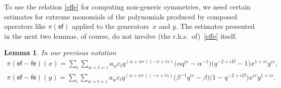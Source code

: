 \documentclass[pdftex]{sigma}
\numberwithin{equation}{section}
\newtheorem{Lemma}[Theorem]{Lemma}
\begin{document}
To use the relation \eqref{effe} for computing non-generic symmetries, we need certain estimates for extreme monomials of the polynomials produced by composed operators like $\pi(\mathsf{ef})$ applied to the generators~$x$ and $y$. The estimates presented in the next two lemmas, of course, do not involve (the r.h.s.\ of)~\eqref{effe} itself.

\begin{Lemma}\label{ef-fe}
In our previous notation
\begin{gather}
\pi(\mathsf{ef-fe})(x) =\sum_i\sum_{w+t=i}a_wc_tq^{(u+wr)(-v+ts)} \big(\alpha q^{is}-\alpha^{-1}\big)\big(q^{-2+iD}-1\big)x^{1+ir}y^{is}, \label{(ef-fe)x}\\
 \pi(\mathsf{ef-fe})(y) =\sum_i\sum_{w+t=i}a_wc_tq^{(u+wr)(-v+ts)} \big(\beta^{-1}q^{ir}-\beta\big) \big(1-q^{-2+iD}\big)x^{ir}y^{1+is}. \label{(ef-fe)y}
\end{gather}
\end{Lemma}
\end{document}
